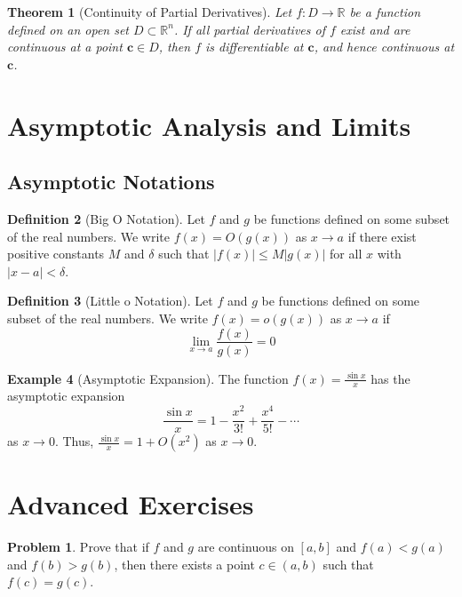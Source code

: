 \documentclass[12pt,a4paper]{article}
\theoremstyle{plain}
\newtheorem{theorem}{Theorem}[section]
\theoremstyle{definition}
\newtheorem{definition}[theorem]{Definition}
\newtheorem{example}[theorem]{Example}
\newtheorem{problem}{Problem}[section]
\begin{document}
\begin{theorem}[Continuity of Partial Derivatives]
Let $f: D \to \mathbb{R}$ be a function defined on an open set $D \subset \mathbb{R}^n$. If all partial derivatives of $f$ exist and are continuous at a point $\mathbf{c} \in D$, then $f$ is differentiable at $\mathbf{c}$, and hence continuous at $\mathbf{c}$.
\end{theorem}

\section{Asymptotic Analysis and Limits}

\subsection{Asymptotic Notations}

\begin{definition}[Big O Notation]
Let $f$ and $g$ be functions defined on some subset of the real numbers. We write $f(x) = O(g(x))$ as $x \to a$ if there exist positive constants $M$ and $\delta$ such that $|f(x)| \leq M |g(x)|$ for all $x$ with $|x - a| < \delta$.
\end{definition}

\begin{definition}[Little o Notation]
Let $f$ and $g$ be functions defined on some subset of the real numbers. We write $f(x) = o(g(x))$ as $x \to a$ if
\begin{equation}
\lim_{x \to a} \frac{f(x)}{g(x)} = 0
\end{equation}
\end{definition}

\begin{example}[Asymptotic Expansion]
The function $f(x) = \frac{\sin x}{x}$ has the asymptotic expansion
\begin{equation}
\frac{\sin x}{x} = 1 - \frac{x^2}{3!} + \frac{x^4}{5!} - \cdots
\end{equation}
as $x \to 0$. Thus, $\frac{\sin x}{x} = 1 + O(x^2)$ as $x \to 0$.
\end{example}

\section{Advanced Exercises}

\begin{problem}
Prove that if $f$ and $g$ are continuous on $[a, b]$ and $f(a) < g(a)$ and $f(b) > g(b)$, then there exists a point $c \in (a, b)$ such that $f(c) = g(c)$.
\end{problem}
\end{document}
